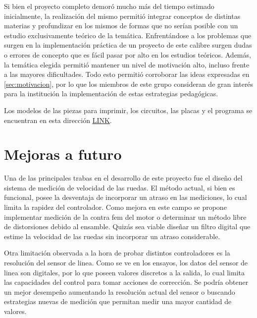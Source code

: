 \documentclass[10pt,conference,a4paper,onecolumn]{article}%
\begin{document}
Si bien el proyecto completo demoró mucho más del tiempo estimado inicialmente, la realización del mismo permitió integrar conceptos de distintas materias y profundizar en los mismos de formas que no serían posible con un estudio exclusivamente teórico de la temática. Enfrentándose a los problemas que surgen en la implementación práctica de un proyecto de este calibre surgen dudas o errores de concepto que es fácil pasar por alto en los estudios teóricos. Además, la temática elegida permitió mantener un nivel de motivación alto, incluso frente a las mayores dificultades. Todo esto permitió corroborar las ideas expresadas en \ref{sec:motivacion}, por lo que los miembros de este grupo consideran de gran interés para la institución la implementación de estas estrategias pedagógicas.
\ %
 
Los modelos de las piezas para imprimir, los circuitos, las placas y el programa se encuentran en esta dirección \href{https://github.com/Seba-san/Trabajo_Final_Controlados/}{\underline{LINK}}.

  


\section{Mejoras a futuro}\label{sec:Trabajo_futuro}
Una de las principales trabas en el desarrollo de este proyecto fue el diseño del sistema de medición de velocidad de las ruedas. El método actual, si bien es funcional, posee la desventaja de incorporar un atraso en las mediciones, lo cual limita la rapidez del controlador. Como mejora en este campo se propone implementar medición de la contra fem del motor o determinar un método libre de distorsiones debido al ensamble. Quizás sea viable diseñar un filtro digital que estime la velocidad de las ruedas sin incorporar un atraso considerable. 

Otra limitación observada a la hora de probar distintos controladores es la resolución del sensor de linea. Como se ve en los ensayos, los datos del sensor de linea son digitales, por lo que poseen valores discretos a la salida, lo cual limita las capacidades del control para tomar acciones de corrección. Se podría obtener un mejor desempeño aumentando la resolución actual del sensor o buscando estrategias nuevas de medición que permitan medir una mayor cantidad de valores.
\end{document}
